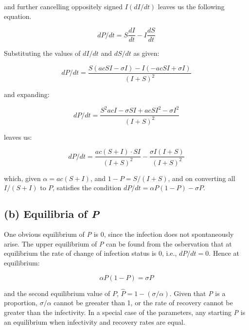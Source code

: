 and further cancelling oppositely signed \(I (dI/dt)\) leaves us the
following equation.

\begin{equation} dP/dt = S \frac{dI}{dt} - I \frac{dS}{dt} \end{equation}

Substituting the values of \(dI/dt\) and \(dS/dt\) as given:

\begin{equation} dP/dt = \frac{S(acSI - \sigma I) - I(-acSI + \sigma I)}{(I+S)^2} \end{equation}

and expanding:

\begin{equation} dP/dt = \frac{S^{2}acI - \sigma SI + acSI^2 - \sigma I^2}{(I+S)^2} \end{equation}

leaves us:

\begin{equation} dP/dt = \frac{ac(S+I) \cdot SI}{(I+S)^2} - \frac{\sigma I(I+S)}{(I+S)^2} \end{equation}

which, given \(\alpha = ac(S+I)\), and \(1 - P = S/(I+S)\), and on
converting all \(I/(S+I)\) to \(P\), satisfies the condition
\(dP/dt = \alpha P (1-P) - \sigma P\).

\hypertarget{b-equilibria-of-p}{%
\subsection{\texorpdfstring{(b) Equilibria of
\emph{P}}{(b) Equilibria of P}}\label{b-equilibria-of-p}}

One obvious equilibrium of \emph{P} is 0, since the infection does not
spontaneously arise. The upper equilibrium of \emph{P} can be found from
the osbervation that at equilibrium the rate of change of infection
status is 0, i.e., \(dP/dt = 0\). Hence at equilibrium:

\begin{equation} \alpha P (1-P) = \sigma P \end{equation}

and the second equilibrium value of \(P\),
\(\hat{P} = 1 - (\sigma/\alpha)\). Given that \emph{P} is a proportion,
\(\sigma/\alpha\) cannot be greeater than 1, or the rate of recovery
cannot be greater than the infectivity. In a special case of the
parameters, any starting \emph{P} is an equilibrium when infectivity and
recovery rates are equal.

